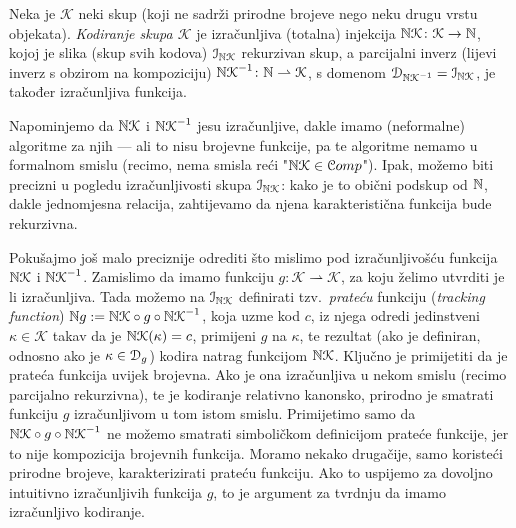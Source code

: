 \begin{definicija}
Neka je $\mathcal K$ neki skup (koji ne sadrži prirodne brojeve nego neku drugu vrstu objekata). \emph{Kodiranje skupa $\mathcal K$} je izračunljiva (totalna) injekcija ${\mathbb N}\mathcal K\colon\mathcal K\to{\mathbb N}$, kojoj je slika (skup svih kodova) $\mathcal I_{{\mathbb N}\mathcal K}$ rekurzivan skup, a parcijalni inverz (lijevi inverz s obzirom na kompoziciju) ${{\mathbb N}\mathcal K}^{-1}\colon{\mathbb N}\rightharpoonup\mathcal K$, s domenom $\mathcal D_{{{\mathbb N}\mathcal K}^{-1}}=\mathcal I_{{\mathbb N}\mathcal K}$, je također izračunljiva funkcija.
\end{definicija}

Napominjemo da ${{\mathbb N}\mathcal K}$ i ${{\mathbb N}\mathcal K}^{-1}$ jesu izračunljive, dakle imamo (neformalne) algoritme za njih --- ali to nisu brojevne funkcije, pa te algoritme nemamo u formalnom smislu (recimo, nema smisla reći "${\mathbb N}\mathcal K\in\mathcal Comp$"). Ipak, možemo biti precizni u pogledu izračunljivosti skupa $\mathcal I_{{\mathbb N}\mathcal K}$: kako je to obični podskup od ${\mathbb N}$, dakle jednomjesna relacija, zahtijevamo da njena karakteristična funkcija bude rekurzivna.

Pokušajmo još malo preciznije odrediti što mislimo pod izračunljivošću funkcija ${{\mathbb N}\mathcal K}$ i ${{\mathbb N}\mathcal K}^{-1}$. Zamislimo da imamo funkciju $g\colon\mathcal K\rightharpoonup\mathcal K$, za koju želimo utvrditi je li izračunljiva. Tada možemo na $\mathcal I_{{\mathbb N}\mathcal K}$ definirati tzv.\ \emph{prateću} funkciju (\emph{tracking function}) ${\mathbb N} g:={{\mathbb N}\mathcal K}\circ g\circ{{\mathbb N}\mathcal K}^{-1}$, koja uzme kod $c$, iz njega odredi jedinstveni $\kappa\in\mathcal K$ takav da je ${{\mathbb N}\mathcal K}(\kappa)=c$, primijeni $g$ na $\kappa$, te rezultat (ako je definiran, odnosno ako je $\kappa\in\mathcal D_{g}$) kodira natrag funkcijom ${{\mathbb N}\mathcal K}$. Ključno je primijetiti da je prateća funkcija uvijek brojevna. Ako je ona izračunljiva u nekom smislu (recimo parcijalno rekurzivna), te je kodiranje relativno kanonsko, prirodno je smatrati funkciju $g$ izračunljivom u tom istom smislu. Primijetimo samo da ${{\mathbb N}\mathcal K}\circ g\circ{{\mathbb N}\mathcal K}^{-1}$ ne možemo smatrati simboličkom definicijom prateće funkcije, jer to nije kompozicija brojevnih funkcija. Moramo nekako drugačije, samo koristeći prirodne brojeve, karakterizirati prateću funkciju. Ako to uspijemo za dovoljno intuitivno izračunljivih funkcija $g$, to je argument za tvrdnju da imamo izračunljivo kodiranje.

